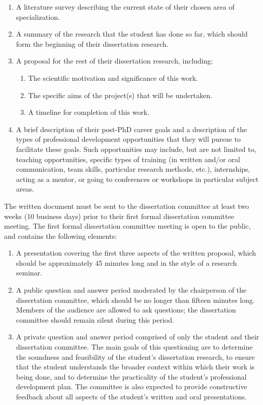 \begin{enumerate}
\item  A literature survey describing the current state of their chosen area of specialization.
\item  A summary of the research that the student has done so far, which should form the beginning of their dissertation research.
\item  A proposal for the rest of their dissertation research, including:

\begin{enumerate}
  \item  The scientific motivation and significance of this work.
  \item  The specific aims of the project(s) that will be undertaken.
  \item  A timeline for completion of this work.
\end{enumerate}

\item  A brief description of their post-PhD career goals and a
  description of the types of professional development opportunities
  that they will pursue to facilitate these goals.  Such opportunities
  may include, but are not limited to, teaching opportunities, specific types of training (in
  written and/or oral communication, team skills, particular research
  methods, etc.), internships, acting as a mentor, or going to
  conferences or workshops in particular subject areas.

\end{enumerate}

The written document must be sent to the dissertation committee at least two
weeks (10 business days) prior to their first formal dissertation committee
meeting.  The first formal dissertation committee meeting is open to the public,
and contains the following elements:

\begin{enumerate}
\item  A presentation covering the first three aspects of the written
  proposal, which should be approximately 45 minutes long and in the
  style of a research seminar.

\item  A public question and answer period moderated by the
  chairperson of the dissertation committee, which should be no longer than
  fifteen minutes long.  Members of the audience are allowed to ask
  questions; the dissertation committee should remain silent during this
  period.

\item  A private question and answer period comprised of only the
  student and their dissertation committee.  The main goals of this
  questioning are to determine the soundness and feasibility of the
  student's dissertation research, to ensure that the student
  understands the broader context within which their work is being
  done, and to determine the practicality of the student's
  professional development plan.  The committee is also expected to
  provide constructive feedback about all aspects of the student's
  written and oral presentations.

\end{enumerate}

